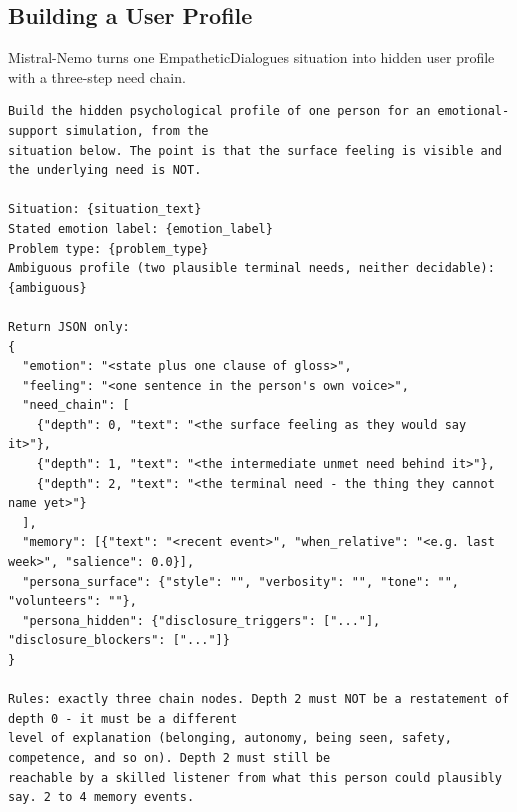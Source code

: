 \documentclass[journal]{IEEEtran}
\begin{document}
\subsection{Building a User Profile}
Mistral-Nemo turns one EmpatheticDialogues situation into hidden user profile with a three-step need chain.
\begin{lstlisting}
Build the hidden psychological profile of one person for an emotional-support simulation, from the
situation below. The point is that the surface feeling is visible and the underlying need is NOT.

Situation: {situation_text}
Stated emotion label: {emotion_label}
Problem type: {problem_type}
Ambiguous profile (two plausible terminal needs, neither decidable): {ambiguous}

Return JSON only:
{
  "emotion": "<state plus one clause of gloss>",
  "feeling": "<one sentence in the person's own voice>",
  "need_chain": [
    {"depth": 0, "text": "<the surface feeling as they would say it>"},
    {"depth": 1, "text": "<the intermediate unmet need behind it>"},
    {"depth": 2, "text": "<the terminal need - the thing they cannot name yet>"}
  ],
  "memory": [{"text": "<recent event>", "when_relative": "<e.g. last week>", "salience": 0.0}],
  "persona_surface": {"style": "", "verbosity": "", "tone": "", "volunteers": ""},
  "persona_hidden": {"disclosure_triggers": ["..."], "disclosure_blockers": ["..."]}
}

Rules: exactly three chain nodes. Depth 2 must NOT be a restatement of depth 0 - it must be a different
level of explanation (belonging, autonomy, being seen, safety, competence, and so on). Depth 2 must still be
reachable by a skilled listener from what this person could plausibly say. 2 to 4 memory events.
\end{lstlisting}
\end{document}
